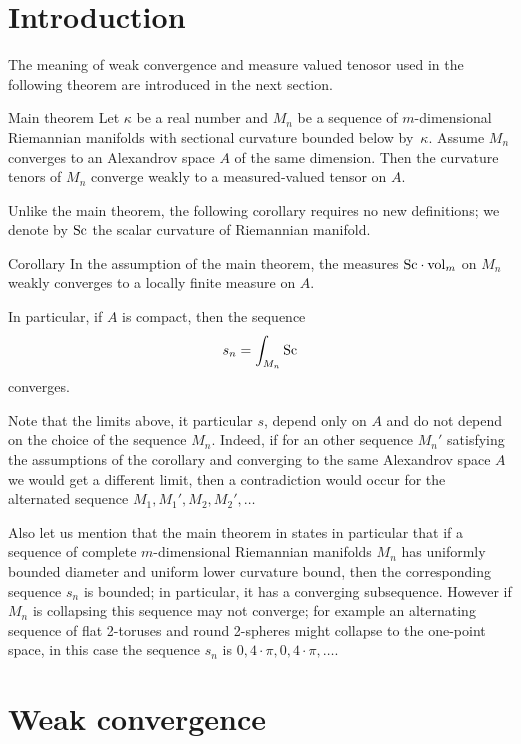 \section{Introduction}

The meaning of weak convergence and measure valued tenosor used in the following theorem are introduced in the next section.

\begin{thm}{Main theorem}
Let $\kappa$ be a real number and 
$M_n$ be a sequence of $m$-dimensional Riemannian manifolds with sectional curvature bounded below by~$\kappa$.
Assume $M_n$ converges to an Alexandrov space $A$ of the same dimension.
Then the curvature tenors of $M_n$ converge weakly to a measured-valued tensor on $A$.
\end{thm}


Unlike the main theorem, the following corollary requires no new definitions; we denote by $\operatorname{Sc}$ the scalar curvature of Riemannian manifold.

\begin{thm}{Corollary}
In the assumption of the main theorem,
the measures $\Sc\cdot\vol_m$ on $M_n$ weakly converges to a locally finite measure on $A$.

In particular, if $A$ is compact, then the sequence
\[s_n=\int_{M_n}\operatorname{Sc}\]
converges.
\end{thm}

Note that the limits above, it particular $s$, depend only on $A$ and do not depend on the choice of the sequence $M_n$.
Indeed, if for an other sequence $M_n'$ satisfying the assumptions of the corollary and converging to the same Alexandrov space $A$ we would get a different limit, 
then a contradiction would occur for the alternated sequence $M_1,M_1',M_2,M_2',\dots$

Also let us mention that the main theorem in \cite{petrunin-SC} states in particular that if a sequence of complete $m$-dimensional Riemannian  manifolds $M_n$ has uniformly bounded diameter and uniform lower curvature bound, then 
the corresponding sequence $s_n$ is bounded; in particular, it has a converging subsequence.
However if $M_n$ is collapsing this sequence may not converge; 
for example an alternating sequence of flat 2-toruses and round 2-spheres might collapse to the one-point space, in this case the sequence $s_n$ is $0,4\cdot\pi,0,4\cdot\pi,\dots$.




\section{Weak convergence}

